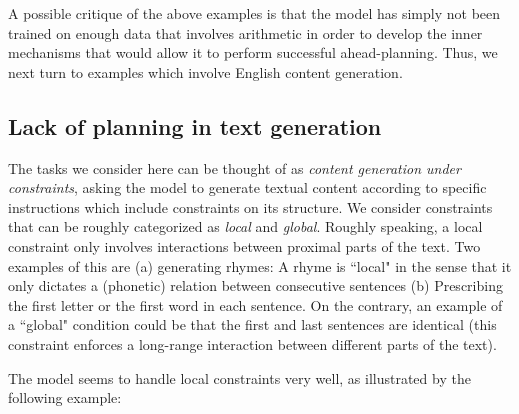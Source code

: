 A possible critique of the above examples is that the model has simply not been trained on enough data that involves arithmetic in order to develop the inner mechanisms that would allow it to perform successful ahead-planning. Thus, we next turn to examples which involve English content generation.

\subsection{Lack of planning in text generation}
The tasks we consider here can be thought of as \emph{content generation under constraints}, asking the model to generate textual content according to specific instructions which include constraints on its structure. We consider constraints that can be roughly categorized as \emph{local} and \emph{global}. Roughly speaking, a local constraint only involves interactions between proximal parts of the text. Two examples of this are (a) generating rhymes: A rhyme is ``local" in the sense that it only dictates a (phonetic) relation between consecutive sentences (b) Prescribing the first letter or the first word in each sentence. On the contrary, an example of a ``global" condition could be that the first and last sentences are identical (this constraint enforces a long-range interaction between different parts of the text).

The model seems to handle local constraints very well, as illustrated by the following example: 

